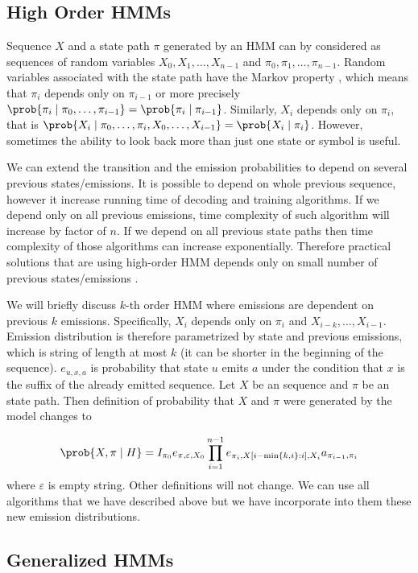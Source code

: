 \subsection{High Order HMMs}

Sequence $X$ and a state path $\pi$ generated by an HMM can by considered 
as sequences of random variables
$X_0,X_1,\dots, X_{n-1}$ and $\pi_0,\pi_1,\dots,\pi_{n-1}$.
Random variables associated with the state path have the Markov
property \cite{Levin2006}, which means that $\pi_i$ depends only on $\pi_{i-1}$ or
more precisely
$\prob{\pi_i\mid\pi_0,\dots,\pi_{i-1}}=\prob{\pi_i\mid\pi_{i-1}}$. Similarly,
$X_i$ depends only on $\pi_i$, that is
$\prob{X_i\mid\pi_0,\dots,\pi_i,X_0,\dots,X_{i-1}}=\prob{X_i\mid\pi_i}$.
However,
sometimes the  ability to look back more than just one state or symbol is useful.

We can extend the transition and the emission probabilities to depend on
several previous states/emissions. It is possible to depend on whole previous
sequence, however it increase running time of decoding and training algorithms.
If we depend only on all previous emissions, time complexity of such algorithm
will increase by factor of $n$. If we depend on all previous state paths then
time complexity of those algorithms can increase exponentially.  Therefore
practical solutions that are using high-order HMM depends only on small number
of previous states/emissions \cite{Brejova2005,Alexanderson2004}.

We will briefly discuss $k$-th order HMM where emissions are dependent on
previous $k$ emissions. Specifically, $X_i$ depends only on $\pi_i$ and
$X_{i-k},\dots,X_{i-1}$. Emission distribution is therefore parametrized by
state and previous emissions, which is string of length at most $k$ (it can be
shorter in the beginning of the sequence). $e_{u,x,a}$ is probability that
state $u$ emits $a$ under the condition that $x$ is the suffix of the already emitted
sequence. Let $X$ be an sequence and $\pi$ be an state path. Then definition
of probability that $X$ and $\pi$ were generated by the model changes to

\[
\prob{X,\pi\mid H} = 
I_{\pi_0}e_{\pi,\varepsilon,X_0}\prod_{i=1}^{n-1}
e_{\pi_i,X[i-\min\{k,i\}:i],X_i}a_{\pi_{i-1},\pi_i}
\]
where $\varepsilon$ is empty string. Other definitions will not change. We can
use all algorithms that we have described above but we have incorporate into
them these new emission distributions.

\subsection{Generalized HMMs}

